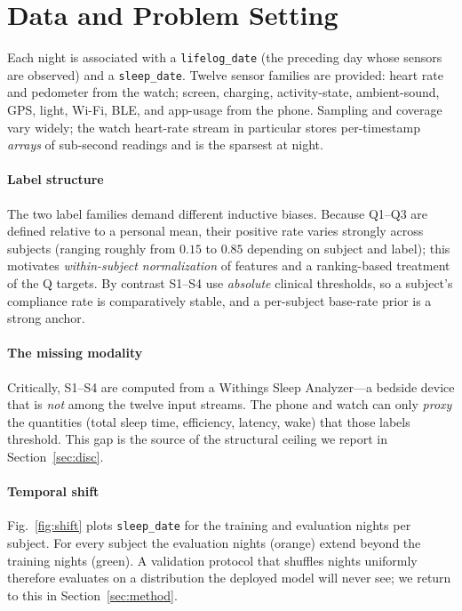 \documentclass[conference]{IEEEtran}
\begin{document}
\section{Data and Problem Setting}
\label{sec:data}
Each night is associated with a \texttt{lifelog\_date} (the preceding day whose
sensors are observed) and a \texttt{sleep\_date}. Twelve sensor families are
provided: heart rate and pedometer from the watch; screen, charging, activity-state,
ambient-sound, GPS, light, Wi-Fi, BLE, and app-usage from the phone. Sampling and
coverage vary widely; the watch heart-rate stream in particular stores per-timestamp
\emph{arrays} of sub-second readings and is the sparsest at night.

\paragraph{Label structure} The two label families demand different inductive
biases. Because Q1--Q3 are defined relative to a personal mean, their positive rate
varies strongly across subjects (ranging roughly from $0.15$ to $0.85$ depending on
subject and label); this motivates \emph{within-subject normalization} of features and
a ranking-based treatment of the Q targets. By contrast S1--S4 use \emph{absolute} clinical thresholds, so a
subject's compliance rate is comparatively stable, and a per-subject base-rate prior
is a strong anchor.

\paragraph{The missing modality} Critically, S1--S4 are computed from a Withings
Sleep Analyzer---a bedside device that is \emph{not} among the twelve input streams.
The phone and watch can only \emph{proxy} the quantities (total sleep time, efficiency,
latency, wake) that those labels threshold. This gap is the source of the structural
ceiling we report in Section~\ref{sec:disc}.

\paragraph{Temporal shift} Fig.~\ref{fig:shift} plots \texttt{sleep\_date} for the
training and evaluation nights per subject. For every subject the evaluation nights
(orange) extend beyond the training nights (green). A validation protocol that
shuffles nights uniformly therefore evaluates on a distribution the deployed model
will never see; we return to this in Section~\ref{sec:method}.
\end{document}
